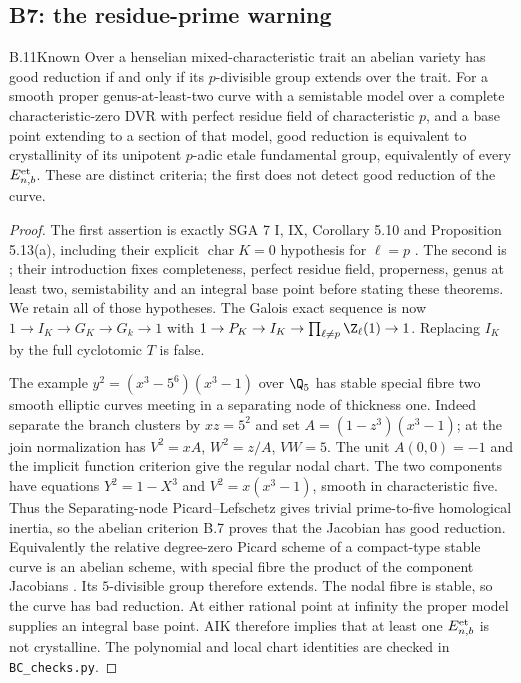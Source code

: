 \subsection{B7: the residue-prime warning}

\begin{claim}{B.11}{Known}
Over a henselian mixed-characteristic trait an abelian variety has good
reduction if and only if its $p$-divisible group extends over the trait.
For a smooth proper genus-at-least-two curve with a semistable model over
a complete characteristic-zero DVR with perfect residue field of
characteristic $p$, and a base point extending to a section of that model,
good reduction is equivalent to crystallinity of its unipotent $p$-adic
etale fundamental group, equivalently of every $E^{\rm et}_{n,b}$.
These are distinct criteria; the first does not detect good reduction of
the curve.
\end{claim}
\begin{proof}
The first assertion is exactly SGA 7 I, IX, Corollary 5.10 and
Proposition 5.13(a), including their explicit $\operatorname{char}K=0$
hypothesis for $\ell=p$ \citep{BC_SGA7}. The second is
\citet[Theorems 1.6 and 1.9]{BC_AIK}; their introduction fixes completeness,
perfect residue field, properness, genus at least two, semistability and
an integral base point before stating these theorems. We retain all of those
hypotheses. The Galois exact sequence is now
$1\to I_K\to G_K\to G_k\to1$ with
$1\to P_K\to I_K\to\prod_{\ell\ne p}\Z_\ell(1)\to1$.
Replacing $I_K$ by the full cyclotomic $T$ is false.

The example $y^2=(x^3-5^6)(x^3-1)$ over $\Q_5$ has stable special fibre two
smooth elliptic curves meeting in a separating node of thickness one.
Indeed separate the branch clusters by $xz=5^2$ and set
$A=(1-z^3)(x^3-1)$; at the join normalization has
$V^2=xA$, $W^2=z/A$, $VW=5$. The unit $A(0,0)=-1$ and the implicit function
criterion give the regular nodal chart. The two components have equations
$Y^2=1-X^3$ and $V^2=x(x^3-1)$, smooth in characteristic five. Thus the
Separating-node Picard--Lefschetz gives trivial prime-to-five homological
inertia, so the abelian criterion B.7 proves that the Jacobian has good
reduction. Equivalently the relative degree-zero Picard
scheme of a compact-type stable curve is an abelian scheme, with special
fibre the product of the component Jacobians
\citep[Introduction, compact-type models]{BC_Dupuy}. Its $5$-divisible
group therefore extends. The nodal fibre is stable,
so the curve has bad reduction. At either rational point at infinity the
proper model supplies an integral base point. AIK therefore implies that
at least one $E^{\rm et}_{n,b}$ is not crystalline. The polynomial and local
chart identities are checked in \texttt{BC\_checks.py}.
\end{proof}


